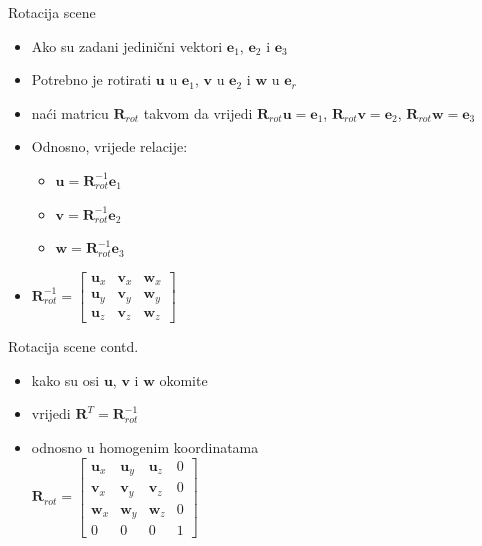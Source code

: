 \documentclass[9pt]{beamer}
\begin{document}
\begin{frame}{Rotacija scene}
	\begin{itemize}
		\item  Ako su zadani jedinični vektori $\mathbf{e}_{1}$, $\mathbf{e}_{2}$ i $\mathbf{e}_{3}$
		\item Potrebno je rotirati $\mathbf{u}$ u $\mathbf{e}_{1}$, $\mathbf{v}$ u $\mathbf{e}_{2}$ i 
		$\mathbf{w}$ u $\mathbf{e}_{r}$
		\item naći matricu $\mathbf{R}_{rot}$ takvom da vrijedi $\mathbf{R}_{rot}\mathbf{u}=\mathbf{e}_{1}$,
		$\mathbf{R}_{rot}\mathbf{v}=\mathbf{e}_{2}$, $\mathbf{R}_{rot}\mathbf{w}=\mathbf{e}_{3}$
		\item Odnosno, vrijede relacije:
		\begin{itemize}
			\item $\mathbf{u} = \mathbf{R}_{rot}^{-1}\mathbf{e}_{1}$
			\item $\mathbf{v} = \mathbf{R}_{rot}^{-1}\mathbf{e}_{2}$
			\item $\mathbf{w} = \mathbf{R}_{rot}^{-1}\mathbf{e}_{3}$
		\end{itemize}
		\item $ \mathbf{R}_{rot}^{-1} = \left[ \begin{array}{ccc}
		\mathbf{u}_{x} & \mathbf{v}_{x} & \mathbf{w}_{x}\\
		\mathbf{u}_{y} & \mathbf{v}_{y} & \mathbf{w}_{y}\\
		\mathbf{u}_{z} & \mathbf{v}_{z} & \mathbf{w}_{z} \end{array}\right]$
	\end{itemize}
\end{frame}

\begin{frame}{Rotacija scene contd.}
	\begin{itemize}
		\item kako su osi $\mathbf{u}$, $\mathbf{v}$ i $\mathbf{w}$ okomite
		\item vrijedi $\mathbf{R}^{T} = \mathbf{R}_{rot}^{-1}$
		\item odnosno u homogenim koordinatama\\
		$ \mathbf{R}_{rot} = \left[ \begin{array}{cccc}
		\mathbf{u}_{x} & \mathbf{u}_{y} & \mathbf{u}_{z} & 0 \\
		\mathbf{v}_{x} & \mathbf{v}_{y} & \mathbf{v}_{z} & 0 \\
		\mathbf{w}_{x} & \mathbf{w}_{y} & \mathbf{w}_{z} & 0 \\
		0			   &	0		    &		0		 & 1 \end{array}\right]$
	\end{itemize}
\end{frame}
\end{document}
